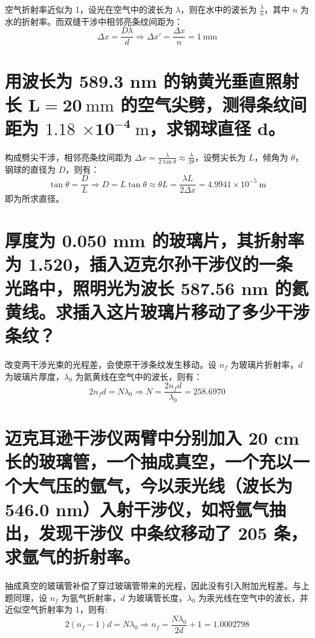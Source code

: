 \documentclass[UTF8]{report}
\theoremstyle{MyLineTheoremStyle} %
\theoremstyle{MyBlockTheoremStyle} %
\theoremstyle{MySubsubsectionStyle} %
\begin{document}
空气折射率近似为 1，设光在空气中的波长为 $\lambda$，则在水中的波长为 $\frac{\lambda}{n}$，其中 $n$ 为水的折射率。而双缝干涉中相邻亮条纹间距为：
\begin{equation}
\Delta x = \frac{D \lambda}{d} \Longrightarrow \Delta x' = \frac{\Delta x}{n} = 1\ \mathrm{mm}
\end{equation}

\section{用波长为 589.3 nm 的钠黄光垂直照射长 $\boldsymbol{L = 20 \ \mathrm{mm}}$  的空气尖劈，测得条纹间距为 $\boldsymbol{1.18}$ $\boldsymbol{ \times 10^{-4}\ \mathrm{m}}$，求钢球直径 $\boldsymbol{d}$。}

构成劈尖干涉，相邻亮条纹间距为 $\Delta x = \frac{\lambda}{2 \tan \theta} \approx  \frac{\lambda}{2 \theta} $，设劈尖长为 $L$，倾角为 $\theta$，钢球的直径为 $D$，则有：
\begin{equation}
\tan \theta = \frac{D}{L} \Longrightarrow D =  L \tan \theta \approx \theta L  = \frac{\lambda L}{2 \Delta x} = 4.9941 \times 10^{-5}\ \mathrm{m}
\end{equation}
即为所求直径。

\section{厚度为 0.050 mm 的玻璃片，其折射率为 1.520，插入迈克尔孙干涉仪的一条光路中，照明光为波长 587.56 nm 的氦黄线。求插入这片玻璃片移动了多少干涉条纹？}

改变两干涉光束的光程差，会使原干涉条纹发生移动。设 $n_f$ 为玻璃片折射率，$d$ 为玻璃片厚度，$\lambda_0$ 为氦黄线在空气中的波长，则有：
\begin{equation}
2 n_f d = N\lambda_0 \Longrightarrow N = \frac{2 n_f d}{\lambda_0} = 258.6970
\end{equation}

\section{迈克耳逊干涉仪两臂中分别加入 20 cm 长的玻璃管，一个抽成真空，一个充以一个大气压的氩气，今以汞光线（波长为 546.0 nm）入射干涉仪，如将氩气抽出，发现干涉仪
中条纹移动了 205 条，求氩气的折射率。}

抽成真空的玻璃管补偿了穿过玻璃管带来的光程，因此没有引入附加光程差。与上题同理，设 $n_f$ 为氩气折射率，$d$ 为玻璃管长度，$\lambda_0$ 为汞光线在空气中的波长，并近似空气折射率为 1，则有: 
\begin{equation}
2 (n_f-1) d = N\lambda_0 \Longrightarrow n_f = \frac{N \lambda_0}{2d} + 1 = 1.0002798
\end{equation}
\end{document}
